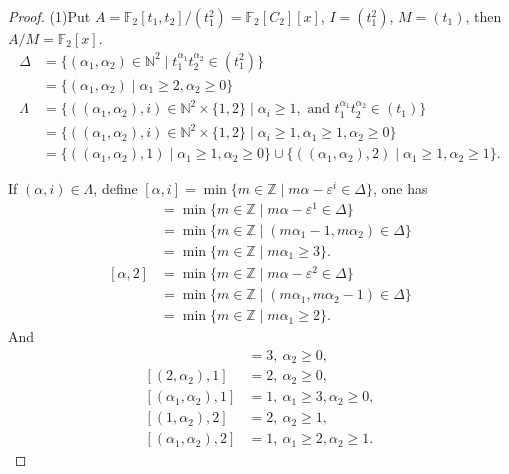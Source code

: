 \begin{proof}
	(1)Put $A=\mathbb{F}_2[t_1,t_2]/(t_1^2)=\mathbb{F}_2[C_{2}][x]$, $I=(t_1^2)$, $M=(t_1)$, then $A/M=\mathbb{F}_2[x]$. 
\begin{align*}
\Delta &=\{(\alpha_1,\alpha_2)\in\mathbb{N}^2\mid  t_1^{\alpha_1}t_2^{\alpha_2}\in (t_1^2)\}\\
	&=\{(\alpha_1,\alpha_2)\mid \alpha_1\geq 2, \alpha_2 \geq 0\}\\
\Lambda &=\{((\alpha_1,\alpha_2),i)\in\mathbb{N}^2 \times \{1,2\}\mid \alpha_i\geq 1, \text{ and } t_1^{\alpha_1}t_2^{\alpha_2}\in (t_1)\} \\
	&=\{((\alpha_1,\alpha_2),i)\in\mathbb{N}^2 \times \{1,2\}\mid \alpha_i\geq 1, \alpha_1\geq 1, \alpha_2\geq 0\} \\
	&=\{((\alpha_1,\alpha_2),1) \mid \alpha_1\geq 1, \alpha_2\geq 0\}\cup \{((\alpha_1,\alpha_2),2) \mid \alpha_1\geq 1, \alpha_2\geq 1\}.
\end{align*}

If $(\alpha,i)\in \Lambda$, define $[\alpha,i] = \min \{m\in \mathbb{Z}\mid m \alpha -\varepsilon^i \in \Delta\}$, one has
\begin{align*}
[\alpha,1] & = \min \{m\in \mathbb{Z} \mid m \alpha -\varepsilon^1 \in \Delta\} \\
& =\min \{m\in \mathbb{Z} \mid (m \alpha_1-1,m \alpha_2)\in \Delta\} \\
& =\min \{m\in \mathbb{Z} \mid m \alpha_1\geq 3\}. \\
[\alpha,2] & = \min \{m\in \mathbb{Z} \mid m \alpha -\varepsilon^2 \in \Delta\} \\
& =\min \{m\in \mathbb{Z} \mid (m \alpha_1,m \alpha_2-1)\in \Delta\} \\
& =\min \{m\in \mathbb{Z} \mid m \alpha_1\geq 2\}.
\end{align*}
And
\begin{align*}
[(1,\alpha_2),1] & = 3, \ \alpha_2\geq 0, \\
[(2,\alpha_2),1] & = 2, \ \alpha_2\geq 0, \\
[(\alpha_1,\alpha_2),1] & = 1, \ \alpha_1\geq 3, \alpha_2\geq 0, \\
[(1,\alpha_2),2] & = 2, \ \alpha_2\geq 1, \\
[(\alpha_1,\alpha_2),2] & = 1, \ \alpha_1\geq 2, \alpha_2\geq 1.
\end{align*}




\end{proof}
